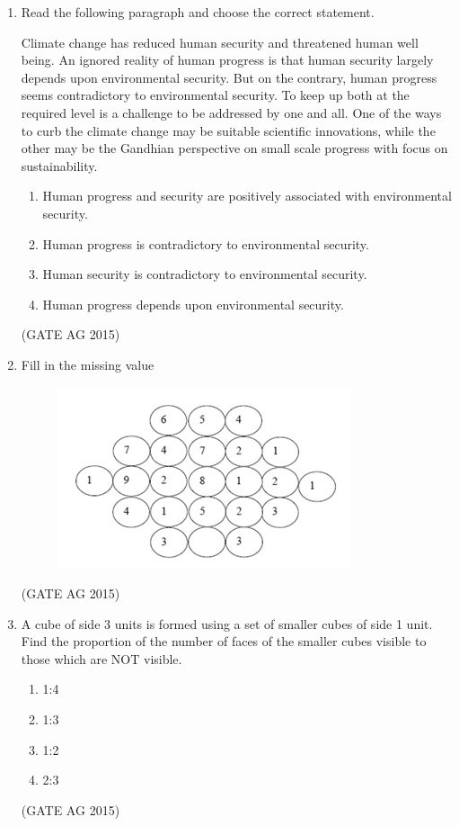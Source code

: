\documentclass[journal,12pt,onecolumn]{IEEEtran}
\theoremstyle{remark}
\begin{document}
\begin{enumerate}
\item 
Read the following paragraph and choose the correct statement.


Climate change has reduced human security and threatened human well being. An ignored reality of human progress is that human security largely depends upon environmental security. But on the contrary, human progress seems contradictory to environmental security. To keep up both at the required level is a challenge to be addressed by one and all. One of the ways to curb the climate change may be suitable scientific innovations, while the other may be the Gandhian perspective on small scale progress with focus on sustainability.

\begin{enumerate}
    \item  Human progress and security are positively associated with environmental security.
    \item  Human progress is contradictory to environmental security.
    \item  Human security is contradictory to environmental security.
    \item  Human progress depends upon environmental security.
\end{enumerate}
\hfill{(GATE AG 2015)}

\item
Fill in the missing value
\begin{figure}[H]
    \centering
    \includegraphics[]{figs/Q.8.png}
    \caption{}
    \label{fig:1}
\end{figure}


\hfill{(GATE AG 2015)}

\item 

A cube of side 3 units is formed using a set of smaller cubes of side 1 unit. Find the proportion of the number of faces of the smaller cubes visible to those which are NOT visible.
\begin{multicols}{4}
\begin{enumerate}
    \item  1:4
    \item  1:3
    \item  1:2
    \item  2:3
\end{enumerate}
\end{multicols}
\hfill{(GATE AG 2015)}


\end{enumerate}
\end{document}
